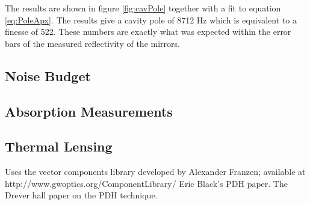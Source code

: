 \documentclass[10pt,a4paper]{article}
\begin{document}
The results are shown in figure \ref{fig:cavPole} together with a fit to equation 
\eqref{eq:PoleApx}.  The results give a cavity pole of 8712 Hz which is equivalent 
to a finesse of 522.  
These numbers are exactly what was expected within the error bars of the measured 
reflectivity of the mirrors.  

\subsection{Noise Budget}

\subsection{Absorption Measurements}

\subsection{Thermal Lensing}


\begin{thebibliography}{9}
		Uses the vector components library developed by Alexander Franzen; available at http://www.gwoptics.org/ComponentLibrary/
		Eric Black's PDH paper.
		The Drever hall paper on the PDH technique.		
\end{thebibliography}		
\end{document}
